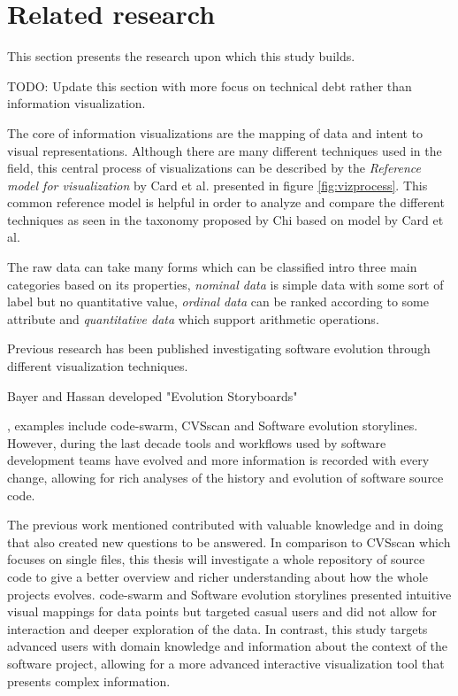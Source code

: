 

\section{Related research}
This section presents the research upon which this study builds.

TODO: Update this section with more focus on technical debt rather than information visualization.

The core of information visualizations are the mapping of data and intent to visual representations. Although there are many different techniques used in the field, this central process of visualizations can be described by the \textit{Reference model for visualization} by Card et al. presented in figure \ref{fig:vizprocess}. \cite{card_readings_1999} 
This common reference model is helpful in order to analyze and compare the different techniques as seen in the taxonomy proposed by Chi based on model by Card et al. \cite{chi_taxonomy_2000}



The raw data can take many forms which can be classified intro three main categories based on its properties, \textit{nominal data} is simple data with some sort of label but no quantitative value, \textit{ordinal data} can be ranked according to some attribute and \textit{quantitative data} which support arithmetic operations. \cite{card_structure_1997}

Previous research has been published investigating software evolution through different visualization techniques. 


Bayer and Hassan developed "Evolution Storyboards"


, examples include code-swarm, CVSscan and Software evolution storylines. However, during the last decade tools and workflows used by software development teams have evolved and more information is recorded with every change, allowing for rich analyses of the history and evolution of software source code.

The previous work mentioned contributed with valuable knowledge and in doing that also created new questions to be answered.
In comparison to CVSscan which focuses on single files, this thesis will investigate a whole repository of source code to give a better overview and richer understanding about how the whole projects evolves.
code-swarm and Software evolution storylines presented intuitive visual mappings for data points but targeted casual users and did not allow for interaction and deeper exploration of the data.
In contrast, this study targets advanced users with domain knowledge and information about the context of the software project, allowing for a more advanced interactive visualization tool that presents complex information.

